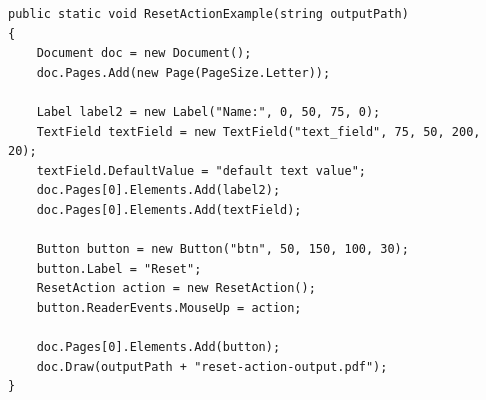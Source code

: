 \documentclass[american,letterpaper]{tufte-book}
\numberwithin{equation}{section}
\numberwithin{figure}{section}
\begin{document}
{{\begin{marginfigure}
\end{marginfigure}

\bgroup{}
\begin{lstlisting}[caption={Resetting a form's values using ResetAction.},label={lis:Resetting-a-form's},basicstyle={\small\ttfamily},breaklines=true]
public static void ResetActionExample(string outputPath)
{
    Document doc = new Document();
    doc.Pages.Add(new Page(PageSize.Letter));

    Label label2 = new Label("Name:", 0, 50, 75, 0);
    TextField textField = new TextField("text_field", 75, 50, 200, 20);
    textField.DefaultValue = "default text value";
    doc.Pages[0].Elements.Add(label2);
    doc.Pages[0].Elements.Add(textField);

    Button button = new Button("btn", 50, 150, 100, 30);
    button.Label = "Reset";
    ResetAction action = new ResetAction();
    button.ReaderEvents.MouseUp = action;

    doc.Pages[0].Elements.Add(button);
    doc.Draw(outputPath + "reset-action-output.pdf");
}
\end{lstlisting}
\leavevmode\egroup
}}
\end{document}
